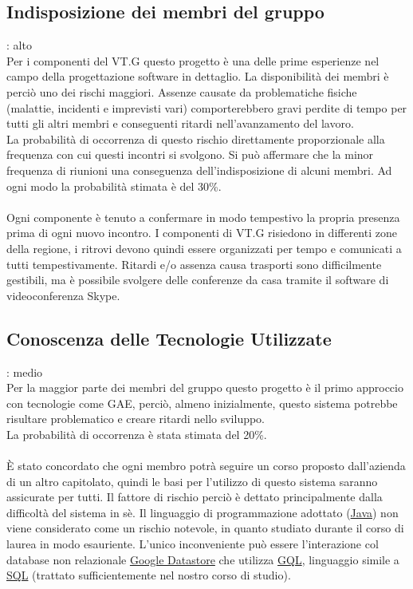 \subsection{Indisposizione dei membri del gruppo}
: alto\\
Per i componenti del VT.G questo progetto \`e una delle prime esperienze nel campo della progettazione software in dettaglio. 
La disponibilit\`a dei membri \`e perci\`o uno dei rischi maggiori. 
Assenze causate da problematiche fisiche (malattie, incidenti e imprevisti vari) comporterebbero gravi perdite 
di tempo per tutti gli altri membri e conseguenti ritardi nell'avanzamento del
lavoro.\\
La probabilit\`a di occorrenza di questo rischio direttamente proporzionale alla
frequenza con cui questi incontri si svolgono. 
Si pu\`o affermare che la minor frequenza di riunioni  una conseguenza dell'indisposizione di alcuni membri.
Ad ogni modo la probabilit\`a stimata \`e del 30\%.\\
\\
Ogni componente \`e tenuto a confermare in modo tempestivo la propria presenza
prima di ogni nuovo incontro. I componenti di VT.G risiedono in differenti zone
della regione, i ritrovi devono quindi essere organizzati per tempo e comunicati
a tutti tempestivamente. Ritardi e/o assenza causa trasporti sono difficilmente
gestibili, ma \`e possibile svolgere delle conferenze da casa tramite il
software di videoconferenza Skype.

\subsection{Conoscenza delle Tecnologie Utilizzate}
: medio\\
Per la maggior parte dei membri del gruppo questo progetto \`e il primo approccio con tecnologie come GAE, 
perci\`o, almeno inizialmente, questo sistema potrebbe risultare problematico e
creare ritardi nello sviluppo.\\
La probabilit\`a di occorrenza \`e stata stimata del 20\%.\\
\\ 
\`E stato concordato che ogni membro potr\`a seguire un corso proposto
  dall'azienda di un altro capitolato, quindi le basi per l'utilizzo di questo
  sistema saranno assicurate per tutti. Il fattore di rischio perci\`o \`e
  dettato principalmente dalla difficolt\`a del sistema in s\`e. Il linguaggio
  di programmazione adottato (\underline{Java}) non viene considerato come un
  rischio notevole, in quanto studiato durante il corso di laurea in modo
  esauriente. L'unico inconveniente pu\`o essere l'interazione col
  database non relazionale \underline{Google Datastore} che utilizza \underline{GQL}, linguaggio simile a
  \underline{SQL} (trattato sufficientemente nel nostro corso di studio).

